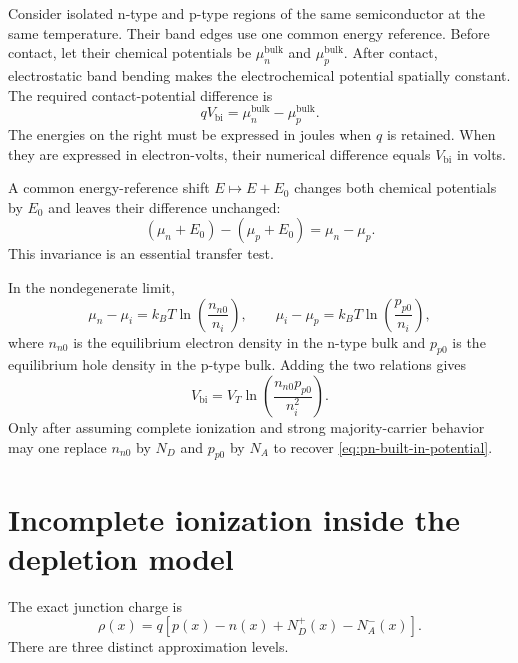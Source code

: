 Consider isolated n-type and p-type regions of the same semiconductor at the
same temperature.  Their band edges use one common energy reference.  Before
contact, let their chemical potentials be $\mu_n^{\mathrm{bulk}}$ and
$\mu_p^{\mathrm{bulk}}$.  After contact, electrostatic band bending makes the
electrochemical potential spatially constant.  The required contact-potential
difference is
\begin{equation}
 \boxed{
 qV_{\mathrm{bi}}
 =\mu_n^{\mathrm{bulk}}-\mu_p^{\mathrm{bulk}}.
 }
 \label{eq:built-in-from-chemical-potentials}
\end{equation}
The energies on the right must be expressed in joules when $q$ is retained.
When they are expressed in electron-volts, their numerical difference equals
$V_{\mathrm{bi}}$ in volts.

A common energy-reference shift $E\mapsto E+E_0$ changes both chemical
potentials by $E_0$ and leaves their difference unchanged:
\begin{equation}
 (\mu_n+E_0)-(\mu_p+E_0)=\mu_n-\mu_p.
 \label{eq:built-in-energy-shift-invariance}
\end{equation}
This invariance is an essential transfer test.

In the nondegenerate limit,
\begin{equation}
 \mu_n-\mu_i=k_BT\ln\left(\frac{n_{n0}}{n_i}\right),
 \qquad
 \mu_i-\mu_p=k_BT\ln\left(\frac{p_{p0}}{n_i}\right),
 \label{eq:bulk-chemical-potentials-carriers}
\end{equation}
where $n_{n0}$ is the equilibrium electron density in the n-type bulk and
$p_{p0}$ is the equilibrium hole density in the p-type bulk.  Adding the two
relations gives
\begin{equation}
 \boxed{
 V_{\mathrm{bi}}
 =V_T\ln\left(\frac{n_{n0}p_{p0}}{n_i^2}\right).
 }
 \label{eq:built-in-from-transferred-carriers}
\end{equation}
Only after assuming complete ionization and strong majority-carrier behavior
may one replace $n_{n0}$ by $N_D$ and $p_{p0}$ by $N_A$ to recover
\cref{eq:pn-built-in-potential}.

\section{Incomplete ionization inside the depletion model}

The exact junction charge is
\begin{equation}
 \rho(x)=q\left[p(x)-n(x)+N_D^+(x)-N_A^-(x)\right].
 \label{eq:ionization-aware-junction-charge}
\end{equation}
There are three distinct approximation levels.

